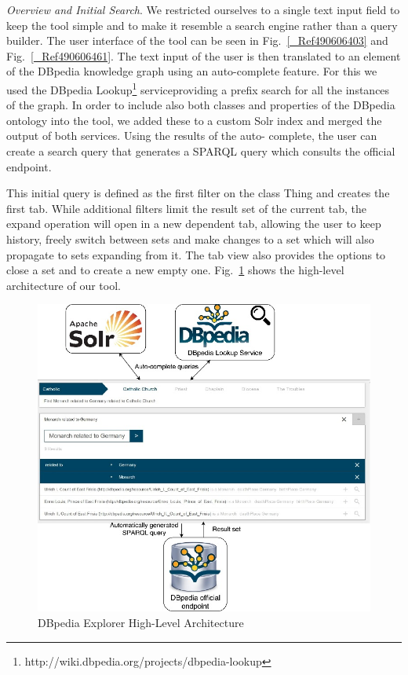 \documentclass{sig-alternate}
\makeatletter
\def\maxwidth#1{\ifdim\Gin@nat@width>#1 #1\else\Gin@nat@width\fi}
\makeatother
\begin{document}
{\em Overview and Initial Search}. We restricted ourselves to a single text input ﬁeld to keep the tool simple and to make it resemble a search engine rather than a query builder. The user interface of the tool can be seen in Fig.~\ref{_Ref490606403} and Fig.~\ref{_Ref490606461}. The text input of the user is then translated to an element of the DBpedia knowledge graph using an auto-complete feature. For this we used the DBpedia Lookup\footnote{ http://wiki.dbpedia.org/projects/dbpedia-lookup} service\textsuperscript{}providing a preﬁx search for all the instances of the graph. In order to include also both classes and properties of the DBpedia ontology into the tool, we added these to a custom Solr index and merged the output of both services. Using the results of the auto- complete, the user can create a search query that generates a SPARQL query which consults the oﬃcial endpoint. 

This initial query is deﬁned as the ﬁrst filter on the class Thing and creates the ﬁrst tab. While additional filters limit the result set of the current tab, the expand operation will open in a new dependent tab, allowing the user to keep history, freely switch between sets and make changes to a set which will also propagate to sets expanding from it. The tab view also provides the options to close a set and to create a new empty one. Fig.~\ref{_Ref490605913} shows the high-level architecture of our tool.
\begin{figure}[h!]
\centering
\includegraphics[width=\maxwidth{\columnwidth}]{./img/image1.jpeg}
\cprotect\caption{  DBpedia  Explorer High-Level Architecture}
\label{_Ref490605913}
\end{figure}
\end{document}
